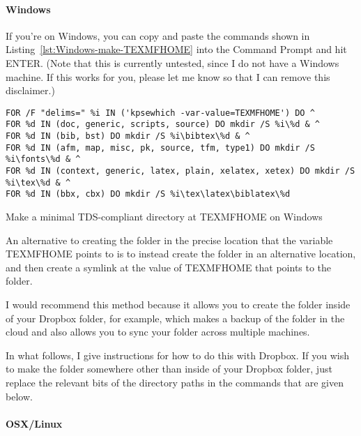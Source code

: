 \paragraph{Windows}

If you're on Windows, you can copy and paste the commands shown in Listing~\ref{lst:Windows-make-TEXMFHOME} into the Command Prompt and hit ENTER.
(Note that this is currently untested, since I do not have a Windows machine.
If this works for you, please let me know so that I can remove this disclaimer.)

\begin{listing}[htbp]
	\centering
	\begin{verbatim}
FOR /F "delims=" %i IN ('kpsewhich -var-value=TEXMFHOME') DO ^
FOR %d IN (doc, generic, scripts, source) DO mkdir /S %i\%d & ^
FOR %d IN (bib, bst) DO mkdir /S %i\bibtex\%d & ^
FOR %d IN (afm, map, misc, pk, source, tfm, type1) DO mkdir /S %i\fonts\%d & ^
FOR %d IN (context, generic, latex, plain, xelatex, xetex) DO mkdir /S %i\tex\%d & ^
FOR %d IN (bbx, cbx) DO mkdir /S %i\tex\latex\biblatex\%d
	\end{verbatim}
	\caption{Make a minimal TDS-compliant directory at TEXMFHOME on Windows}
	\label{lst:Windows-make-TEXMFHOME}
\end{listing}

\label{subsubsubsec:symlink-your-local-texmf-folder-into-TEXMFHOME}

An alternative to creating the  folder in the precise location that the variable TEXMFHOME points to is to instead create the folder in an alternative location, and then create a symlink at the value of TEXMFHOME that points to the  folder.

I would recommend this method because it allows you to create the  folder inside of your Dropbox folder, for example, which makes a backup of the  folder in the cloud and also allows you to sync your  folder across multiple machines.

In what follows, I give instructions for how to do this with Dropbox.
If you wish to make the folder somewhere other than inside of your Dropbox folder, just replace the relevant bits of the directory paths in the commands that are given below.

\paragraph{OSX/Linux}

